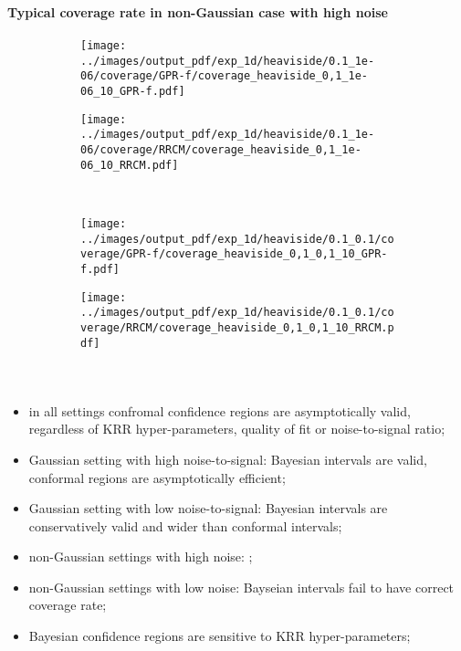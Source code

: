 \documentclass[t]{beamer}  %
\begin{document}
\begin{frame}[t]\frametitle{\insertsection}
  \framesubtitle{Typical coverage rate in non-Gaussian case with high noise}
  \begin{figure}%
    \centering
    \begin{subfigure}[b]{0.45\linewidth}
      \texttt{[image: ../images/output\_pdf/exp\_1d/heaviside/0.1\_1e-06/coverage/GPR-f/coverage\_heaviside\_0,1\_1e-06\_10\_GPR-f.pdf]}
    \end{subfigure}%
    \begin{subfigure}[b]{0.45\linewidth}
      \texttt{[image: ../images/output\_pdf/exp\_1d/heaviside/0.1\_1e-06/coverage/RRCM/coverage\_heaviside\_0,1\_1e-06\_10\_RRCM.pdf]}
    \end{subfigure}\\
    \begin{subfigure}[b]{0.45\linewidth}
      \texttt{[image: ../images/output\_pdf/exp\_1d/heaviside/0.1\_0.1/coverage/GPR-f/coverage\_heaviside\_0,1\_0,1\_10\_GPR-f.pdf]}
    \end{subfigure}%
    \begin{subfigure}[b]{0.45\linewidth}
      \texttt{[image: ../images/output\_pdf/exp\_1d/heaviside/0.1\_0.1/coverage/RRCM/coverage\_heaviside\_0,1\_0,1\_10\_RRCM.pdf]}
    \end{subfigure}\\
    \label{fig:heaviside_1d_high_noise_arb}
  \end{figure}
\end{frame}

\begin{frame}[c]\frametitle{\insertsection}
  \framesubtitle{\insertsubsection}
  \begin{itemize}
    \item in all settings confromal confidence regions are asymptotically valid,
    regardless of KRR hyper-parameters, quality of fit or noise-to-signal ratio;
    \item Gaussian setting with high noise-to-signal: Bayesian intervals are valid,
    conformal regions are asymptotically efficient;
    \item Gaussian setting with low noise-to-signal: Bayesian intervals are
    conservatively valid and wider than conformal intervals;
    \item non-Gaussian settings with high noise: ;
    \item non-Gaussian settings with low noise: Bayseian intervals fail to have
    correct coverage rate;
    \item Bayesian confidence regions are sensitive to KRR hyper-parameters;
  \end{itemize}
\end{frame}
\end{document}
